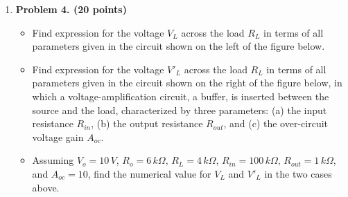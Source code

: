 \begin{enumerate}

\begin{comment}
 {\bf Solution:} 
 Apply Thevenin thm to base circuit to get $R_B=R_1 || R_2=6.7K$, $V_{BB}=6.7V$.
 \[ I_B=(V_{BB}-V_{BE})/(R_B+(\beta+1)R_E)=6V/(6.7K+101\times 0.5K)=0.106 mA \]
 \[ I_C=I_E=10.6 mA \]
 \[ V_E=0.5\times 10.6=5.3V,\;\;\;\; V_C=20-0.5\times 10.6=14.7V,\;\;\;\;
 	V_{CE}=V_C-V_E=14.7-5.3=9.4V \]
 \[ v_1(t)=-5 cos(\omega t) V,\;\;\;\;v_1(t)=5 cos(\omega t) V	\]
\end{comment}


\item {\bf Problem 4. (20 points)} 
  \begin{itemize}
  \item Find expression for the voltage $V_L$ across the load $R_L$ in terms 
    of all parameters given in the circuit shown on the left of the figure 
    below.
  \item Find expression for the voltage $V'_L$ across the load $R_L$ in terms 
    of all parameters given in the circuit shown on the right of the figure 
    below, in which a voltage-amplification circuit, a buffer, is inserted 
    between the source and the load, characterized by three parameters: 
    (a) the input resistance $R_{in}$, (b) the output resistance $R_{out}$, 
    and (c) the over-circuit voltage gain $A_{oc}$. 
  \item Assuming $V_o=10\,V$, $R_o=6\,k\Omega$, $R_L=4\,k\Omega$, 
    $R_{in}=100\,k\Omega$, $R_{out}=1\,k\Omega$, and $A_{oc}=10$, find the 
    numerical value for $V_L$ and $V'_L$ in the two cases above.
  \end{itemize}

\begin{comment}

{\bf Solution:}
\begin{itemize}
\item \[ V_L=V_o \frac{R_L}{R_o+R_L} \]
\item \[ V'_L=A_{oc}V_o \frac{R_{in}}{R_o+R_{in}}\frac{R_L}{R_{out}+R_L} \]
\item \[ V_L=V_o \frac{R_L}{R_o+R_L}=10\frac{4}{6+4}=4  \]
  \[ V'_L=A_{oc}V_o \frac{R_{in}}{R_o+R_{in}}\frac{R_L}{R_{out}+R_L} 
  =10\times 10\frac{100}{6+100}\frac{4}{1+4}=75.47 \]
\end{itemize}
\end{comment}

\end{enumerate}



